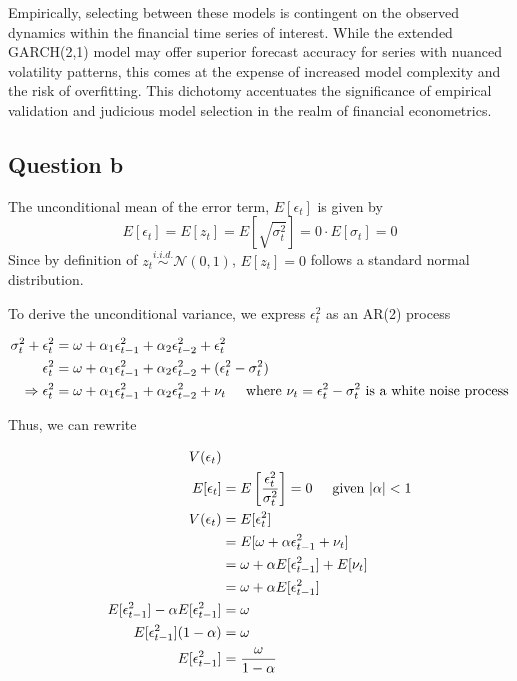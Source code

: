 \documentclass{article}
\begin{document}
Empirically, selecting between these models is contingent on the observed dynamics within the financial time series of interest. While the extended GARCH(2,1) model may offer superior forecast accuracy for series with nuanced volatility patterns, this comes at the expense of increased model complexity and the risk of overfitting. This dichotomy accentuates the significance of empirical validation and judicious model selection in the realm of financial econometrics.

\subsection*{Question b}

The unconditional mean of the error term, $E \left[ \epsilon_t \right]$ is given by
\[
	E \left[ \epsilon_t \right] = E \left[ z_{t}  \right] = E \left[ \sqrt{\sigma_t^2}   \right]   = 0 \cdot E \left[ \sigma_t \right] = 0
\]
Since by definition of $z_t \stackrel{i . i . d .}{\sim} \mathcal{N}(0,1)$, $E \left[ z_{t} \right] =0$ follows a standard normal distribution. 

To derive the unconditional variance, we express $\epsilon_t^2$ as an AR(2) process 

\begin{align*}
\sigma_t^2 + \epsilon_t^2 &= \omega + \alpha_1 \epsilon_{t-1}^2 + \alpha_2 \epsilon_{t-2}^2 + \epsilon_t^2 \\
\epsilon_t^2 &= \omega + \alpha_1 \epsilon_{t-1}^2 + \alpha_2 \epsilon_{t-2}^2 + (\epsilon_t^2 - \sigma_t^2) \\
\Rightarrow \epsilon_t^2 &= \omega + \alpha_1 \epsilon_{t-1}^2 + \alpha_2 \epsilon_{t-2}^2 + \nu_t \hspace{5mm} \text{where} \ \nu_t = \epsilon_t^2 - \sigma_t^2 \ \text{is a white noise process}  
\end{align*}

Thus, we can rewrite 

\begin{align*}
V(\epsilon_t) & \\
E[\epsilon_t] &= E\left[ \frac{\epsilon_t^2}{\sigma_t^2} \right] = 0 \hspace{5mm} \text{given } |\alpha| < 1 \\
V(\epsilon_t) &= E[\epsilon_t^2] \\
&= E[\omega + \alpha \epsilon_{t-1}^2 + \nu_t] \\
&= \omega + \alpha E[\epsilon_{t-1}^2] + E[\nu_t] \\
&= \omega + \alpha E[\epsilon_{t-1}^2] \\
E[\epsilon_{t-1}^2] - \alpha E[\epsilon_{t-1}^2] &= \omega \\
E[\epsilon_{t-1}^2] (1 - \alpha) &= \omega \\
E[\epsilon_{t-1}^2] &= \frac{\omega}{1 - \alpha}
\end{align*}
\end{document}
